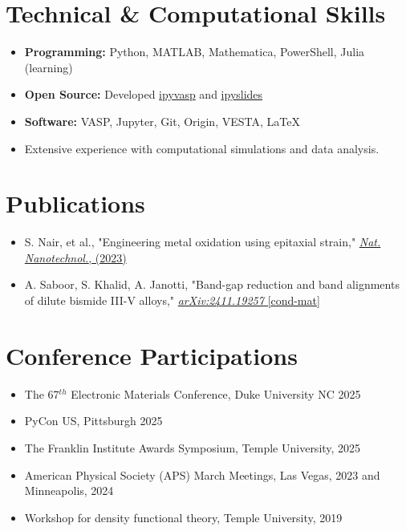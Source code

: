 \documentclass[letter,11pt]{article}
\begin{document}
\section{Technical \& Computational Skills}
\begin{itemize}
\item \textbf{Programming:} Python, MATLAB, Mathematica, PowerShell, Julia (learning)
\item \textbf{Open Source:} Developed \href{https://github.com/asaboor-gh/ipyvasp}{ipyvasp} and \href{https://github.com/asaboor-gh/ipyslides}{ipyslides}
\item \textbf{Software:} VASP, Jupyter, Git, Origin, VESTA, \LaTeX
\item Extensive experience with computational simulations and data analysis.
\end{itemize}

\section{Publications}
\begin{itemize}
    \item S. Nair, et al., "Engineering metal oxidation using epitaxial strain," \href{https://www.nature.com/articles/s41565-023-01397-0}{\textit{Nat. Nanotechnol.}, (2023)}
    \item A. Saboor, S. Khalid, A. Janotti, "Band-gap reduction and band alignments of dilute bismide III-V alloys," \href{https://arxiv.org/abs/2411.19257}{\textit{arXiv:2411.19257} [cond-mat]}

\end{itemize}

\section{Conference Participations}
\begin{itemize}
\item The 67$^{th}$ Electronic Materials Conference, Duke University NC 2025
\item PyCon US, Pittsburgh 2025
\item The Franklin Institute Awards Symposium, Temple University, 2025
\item American Physical Society (APS) March Meetings, Las Vegas, 2023 and Minneapolis, 2024
\item Workshop for density functional theory, Temple University, 2019
\end{itemize}
\end{document}
